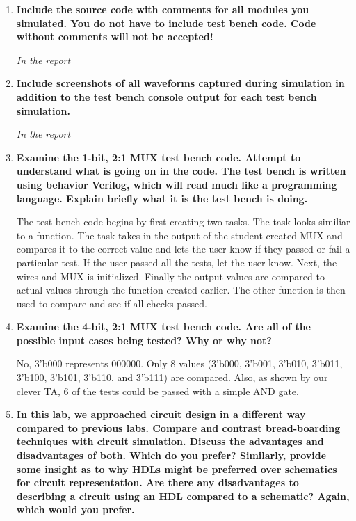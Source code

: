 \documentclass[a4paper,12pt]{article}
\begin{document}
\begin{enumerate}
  \item \textbf{Include the source code with comments for all modules you simulated. You do not have to include test bench code. Code without comments will not be accepted!}
  \vspace{10pt}

  \textit{In the report}

  \item \textbf{Include screenshots of all waveforms captured during simulation in addition to the test bench console output for each test bench simulation.}

  \textit{In the report}

  \item \textbf{Examine the 1-bit, 2:1 MUX test bench code. Attempt to understand what is going on in the code. The test bench is written using behavior Verilog, which will read much like a programming language. Explain briefly what it is the test bench is doing.}
  \vspace{10pt}

  The test bench code begins by first creating two tasks. The task looks similiar to a function. The task takes in the output of the student created MUX and compares it to the
  correct value and lets the user know if they passed or fail a particular test. If the user passed all the tests, let the
  user know. Next, the wires and MUX is initialized. Finally the
  output values are compared to actual values through the
  function created earlier. The other function is then used to compare and see if all checks passed.

  \item \textbf{Examine the 4-bit, 2:1 MUX test bench code. Are all of the possible input cases being tested? Why or why not?}
  \vspace{10pt}

  No, 3'b000 represents 000000. Only 8 values (3'b000, 3'b001, 3'b010, 3'b011, 3'b100, 3'b101, 3'b110, and 3'b111) are compared. Also, as shown by our clever TA, 6 of the tests could be passed with a simple AND gate.

  \item \textbf{In this lab, we approached circuit design in a different way compared to previous labs. Compare and contrast bread-boarding techniques with circuit simulation. Discuss the advantages and disadvantages of both. Which do you prefer? Similarly, provide some insight as to why HDLs might be preferred over schematics for circuit representation. Are there any disadvantages to describing a circuit using an HDL compared to a schematic? Again, which would you prefer.}
  \vspace{10pt}


\end{enumerate}
\end{document}
